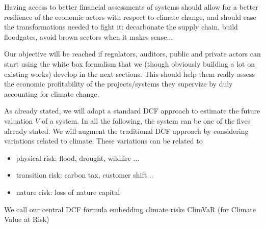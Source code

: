 \vspace{0.2cm}

Having access to better financial assessments of systems should allow for a better resilience of the economic actors with respect to climate change, and should ease the transformations needed to fight it: decarbonate the supply chain, build floodgates, avoid brown sectors when it makes sense...

\vspace{0.2cm}

Our objective will be reached if regulators, auditors, public and private actors can start using the white box formalism that we (though obviously building a lot on existing works) develop in the next sections. This should help them really assess the economic profitability of the projects/systems they supervize by duly accounting for climate change.

\vspace{0.2cm}

As already stated, we will adapt a standard DCF approach to estimate the future valuation $V$ of a system. In all the following, the system can be one of the fives already stated. We will augment the traditional DCF approach by considering variations related to climate. These variations can be related to 
\begin{itemize}
\item[$\bullet$] physical risk: flood, drought, wildfire \cite{IPPC1}\cite{IPPC2}...
\item[$\bullet$] transition risk: carbon tax, customer shift  \cite{Adenot}\cite{RoncalliCC}\cite{Bouchet}\cite{NGFS1}..
\item[$\bullet$] nature risk: loss of nature capital \cite{RoncalliNatureCap}
\end{itemize}

We call our central DCF formula embedding climate risks ClimVaR (for Climate Value at Risk)

\vspace{0.2cm}

